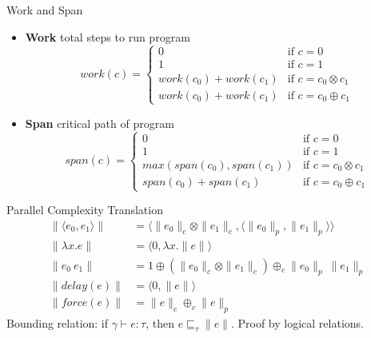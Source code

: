 \documentclass[pdf]{beamer}
\newcommand{\LP}{\langle}
\newcommand{\RP}{\rangle}
\begin{document}
\begin{frame}{Work and Span}
  \begin{itemize}
    \item \textbf{Work} total steps to run program
      \begin{equation*}
        work(c) = \begin{cases}
          0 &\text{if } c = 0 \\
          1 &\text{if } c = 1 \\
          work(c_0) + work(c_1) &\text{if } c = c_0 \otimes c_1 \\
          work(c_0) + work(c_1) &\text{if } c = c_0 \oplus c_1
        \end{cases}
      \end{equation*}
    \item \textbf{Span} critical path of program
      \begin{equation*}
        span(c) = \begin{cases}
          0 &\text{if } c = 0 \\
          1 &\text{if } c = 1 \\
          max(span(c_0), span(c_1)) &\text{if } c = c_0 \otimes c_1 \\
          span(c_0) + span(c_1) &\text{if } c = c_0 \oplus c_1
        \end{cases}
      \end{equation*}
  \end{itemize}
\end{frame}

\begin{frame}{Parallel Complexity Translation}
  \begin{align*}
    \|\LP e_0, e_1 \RP \| &= \LP \|e_0\|_c \otimes \|e_1\|_c, \LP \|e_0\|_p, \|e_1\|_p\RP\RP \\
    \|\lambda x.e\| &= \LP 0, \lambda x.\|e\| \RP \\
    \|e_0\ e_1\| &= 1 \oplus (\|e_0\|_c \otimes \|e_1\|_c) \oplus_c \|e_0\|_p\ \|e_1\|_p \\
    \|delay(e)\| &= \LP 0, \|e\|\RP \\
    \|force(e)\| &= \|e\|_c \oplus_c \|e\|_p
  \end{align*}
  Bounding relation: if $\gamma \vdash e : \tau$, then $e \sqsubseteq_\tau \|e\|$.
  Proof by logical relations.
\end{frame}
\end{document}
